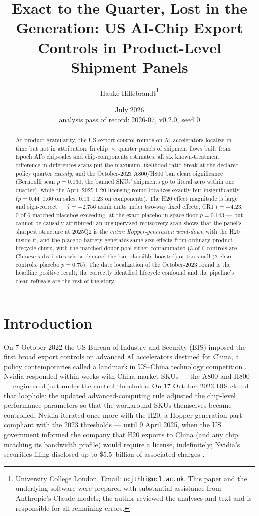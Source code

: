 \documentclass[11pt]{article}
\title{Exact to the Quarter, Lost in the Generation: US AI-Chip Export
Controls in Product-Level Shipment Panels}
\author{Hauke Hillebrandt\thanks{University College London. Email:
\texttt{ucjthhi@ucl.ac.uk}. This paper and the underlying \natex{} software were
prepared with substantial assistance from Anthropic's Claude models; the author
reviewed the analyses and text and is responsible for all remaining errors.}}
\date{July 2026 \\ \small analysis pass of record: 2026-07, \natex{} v0.2.0, seed 0}
\begin{document}
\maketitle

\begin{abstract}
\noindent At product granularity, the US export-control rounds on AI
accelerators localize in time but not in attribution. In chip~$\times$~quarter
panels of shipment flows built from Epoch AI's chip-sales and chip-components
estimates, all six known-treatment difference-in-differences scans put the
maximum-likelihood-ratio break at the declared policy quarter \emph{exactly},
and the October-2023 A800/H800 ban clears significance (Bernoulli scan
$p=0.030$; the banned SKUs' shipments go to literal zero within one quarter),
while the April-2025 H20 licensing round localizes exactly but insignificantly
($p=0.44$--$0.60$ on sales, $0.13$--$0.23$ on components). The H20 effect
magnitude is large and sign-correct --- $\hat\tau=-2.756$ asinh units under
two-way fixed effects, CR1 $t=-4.23$, 0 of 6 matched placebos exceeding, at
the exact placebo-in-space floor $p=0.143$ --- but cannot be causally
attributed: an unsupervised rediscovery scan shows that the panel's sharpest
structure at 2025Q2 is the \emph{entire Hopper-generation wind-down} with the
H20 inside it, and the placebo battery generates same-size effects from
ordinary product-lifecycle churn, with the matched donor pool either
contaminated (3 of 6 controls are Chinese substitutes whose demand the ban
plausibly boosted) or too small (3 clean controls, placebo $p=0.75$). The
date localization of the October-2023 round is the headline positive result;
the correctly identified lifecycle confound and the pipeline's clean refusals
are the rest of the story.
\end{abstract}

\section{Introduction}\label{sec:intro}

On 7 October 2022 the US Bureau of Industry and Security (BIS) imposed the
first broad export controls on advanced AI accelerators destined for China, a
policy contemporaries called a landmark in US--China technology competition
\cite{allen2022}. Nvidia responded within weeks with China-market SKUs --- the
A800 and H800 --- engineered just under the control thresholds. On 17 October
2023 BIS closed that loophole: the updated advanced-computing rule
\cite{bis2023} adjusted the chip-level performance parameters so that the
workaround SKUs themselves became controlled. Nvidia iterated once more with
the H20, a Hopper-generation part compliant with the 2023 thresholds ---
until 9 April 2025, when the US government informed the company that H20
exports to China (and any chip matching its bandwidth profile) would require
a license, indefinitely; Nvidia's securities filing disclosed up to
\$5.5~billion of associated charges \cite{nvidia2025}.
\end{document}
